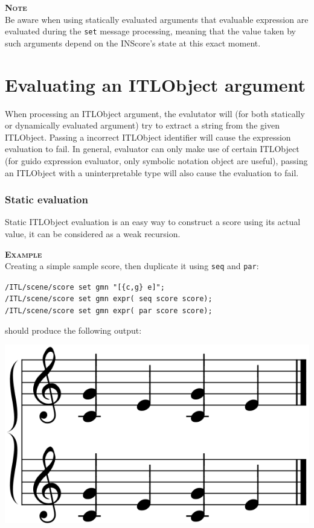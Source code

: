 \documentclass[a4paper,twoside]{report}
\newcommand{\sublevel}[1]	{\section{#1}}
\newcommand{\OSC}[1]		{\texttt{#1}}
\newcommand{\example}		{\textbf{\hspace{-1.5cm}\textbf{\textsc{Example }}}}
\newcommand{\note}	[1]		{\vspace{2mm}\textbf{\hspace{-1.03cm}\textbf{\textsc{Note #1}}}}
\newcommand{\sample}	[1]			{\vspace{-2mm}\begin{center}\colorbox{mygrey}{
								\begin{minipage}[t]{0.9\columnwidth} 
								{\small \texttt{#1}}
								\end{minipage}}\end{center}}
\begin{document}
\note \\
Be aware when using statically evaluated arguments that evaluable expression are evaluated during the \OSC{set} message processing, meaning that the value taken by such arguments depend on the INScore's state at this exact moment.

\sublevel{Evaluating an ITLObject argument}

When processing an ITLObject argument, the evalutator will (for both statically or dynamically evaluated argument) try to extract a string from the given ITLObject. Passing a incorrect ITLObject identifier will cause the expression evaluation to fail. In general, evaluator can only make use of certain ITLObject (for guido expression evaluator, only symbolic notation object are useful), passing an ITLObject with a uninterpretable type will also cause the evaluation to fail.



\subsubsection*{Static evaluation}

Static ITLObject evaluation is an easy way to construct a score using its actual value, it can be considered as a weak recursion.
\pagebreak

\example\\
Creating a simple sample score, then duplicate it using \OSC{seq} and \OSC{par}:
\sample{/ITL/scene/score set gmn "[\{c,g\} e]";\\
/ITL/scene/score set gmn expr( seq score score);\\
/ITL/scene/score set gmn expr( par score score);
}
should produce the following output:\\
\begin{center}
\includegraphics[scale=0.3]{imgs/seqpar}
\end{center}
\end{document}
